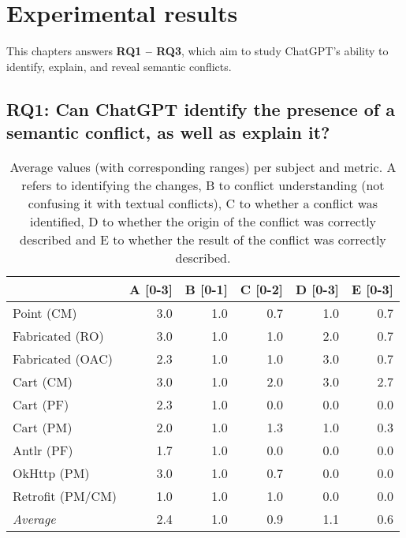 \chapter{Experimental results}\label{chap:results}

This chapters answers \textbf{RQ1 -- RQ3}, which aim to study ChatGPT's ability to identify, explain, and reveal semantic conflicts. %

\section[Research Question 1: Conflict Explanation]{RQ1: Can ChatGPT identify the presence of a semantic conflict, as well as explain it?}\label{sec:results:rq1}

\begin{table}[t]
\centering
\begin{tabular}{@{\extracolsep{\fill}} lrrrrr} \toprule
                 & A [0-3] & B [0-1] & C [0-2] & D [0-3] & E [0-3] \\
\midrule
Point (CM)       & 3.0 & 1.0 & 0.7 & 1.0 & 0.7 \\
Fabricated (RO)  & 3.0 & 1.0 & 1.0 & 2.0 & 0.7 \\
Fabricated (OAC) & 2.3 & 1.0 & 1.0 & 3.0 & 0.7 \\
Cart (CM)        & 3.0 & 1.0 & 2.0 & 3.0 & 2.7 \\
Cart (PF)        & 2.3 & 1.0 & 0.0 & 0.0 & 0.0 \\
Cart (PM)        & 2.0 & 1.0 & 1.3 & 1.0 & 0.3 \\
Antlr (PF)       & 1.7 & 1.0 & 0.0 & 0.0 & 0.0 \\
OkHttp (PM)      & 3.0 & 1.0 & 0.7 & 0.0 & 0.0 \\
Retrofit (PM/CM) & 1.0 & 1.0 & 1.0 & 0.0 & 0.0 \\
\midrule
\textit{Average}  & 2.4 & 1.0 & 0.9 & 1.1 & 0.6 \\
\bottomrule
\end{tabular}
\caption{Average values (with corresponding ranges) per subject and metric.
A refers to identifying the changes, B to conflict understanding (not confusing it with textual conflicts),
C to whether a conflict was identified, D to whether the origin of the conflict was correctly described and
E to whether the result of the conflict was correctly described.
\label{tab:results:rq1}}
\end{table}

